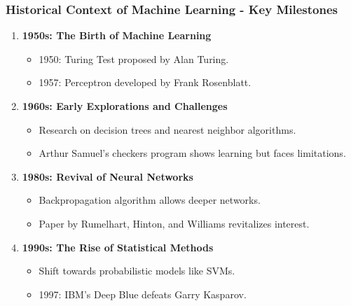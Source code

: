 \documentclass[aspectratio=169]{beamer}
\begin{document}
\begin{frame}[fragile]
    \frametitle{Historical Context of Machine Learning - Key Milestones}
    \begin{enumerate}
        \item \textbf{1950s: The Birth of Machine Learning}
            \begin{itemize}
                \item 1950: Turing Test proposed by Alan Turing.
                \item 1957: Perceptron developed by Frank Rosenblatt.
            \end{itemize}
        \item \textbf{1960s: Early Explorations and Challenges}
            \begin{itemize}
                \item Research on decision trees and nearest neighbor algorithms.
                \item Arthur Samuel's checkers program shows learning but faces limitations.
            \end{itemize}
        \item \textbf{1980s: Revival of Neural Networks}
            \begin{itemize}
                \item Backpropagation algorithm allows deeper networks.
                \item Paper by Rumelhart, Hinton, and Williams revitalizes interest.
            \end{itemize}
        \item \textbf{1990s: The Rise of Statistical Methods}
            \begin{itemize}
                \item Shift towards probabilistic models like SVMs.
                \item 1997: IBM’s Deep Blue defeats Garry Kasparov.
            \end{itemize}
    \end{enumerate}
\end{frame}
\end{document}
